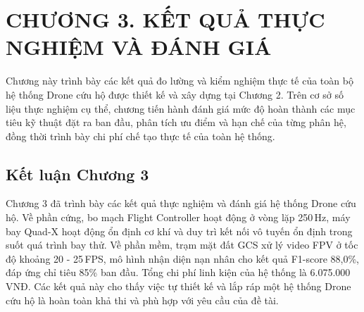 \section*{CHƯƠNG 3. KẾT QUẢ THỰC NGHIỆM VÀ ĐÁNH GIÁ}
\setcounter{section}{3}
\setcounter{subsection}{0}
\setcounter{figure}{0}
\setcounter{table}{0}

Chương này trình bày các kết quả đo lường và kiểm nghiệm thực tế của toàn bộ hệ thống Drone cứu hộ được thiết kế và xây dựng tại Chương 2. Trên cơ sở số liệu thực nghiệm cụ thể, chương tiến hành đánh giá mức độ hoàn thành các mục tiêu kỹ thuật đặt ra ban đầu, phân tích ưu điểm và hạn chế của từng phân hệ, đồng thời trình bày chi phí chế tạo thực tế của toàn hệ thống.



\subsection*{Kết luận Chương 3}

Chương 3 đã trình bày các kết quả thực nghiệm và đánh giá hệ thống Drone cứu hộ. Về phần cứng, bo mạch Flight Controller hoạt động ở vòng lặp 250\,Hz, máy bay Quad-X hoạt động ổn định cơ khí và duy trì kết nối vô tuyến ổn định trong suốt quá trình bay thử. Về phần mềm, trạm mặt đất GCS xử lý video FPV ở tốc độ khoảng 20 - 25\,FPS, mô hình nhận diện nạn nhân cho kết quả F1-score 88,0\%, đáp ứng chỉ tiêu 85\% ban đầu. Tổng chi phí linh kiện của hệ thống là 6.075.000\,VNĐ. Các kết quả này cho thấy việc tự thiết kế và lắp ráp một hệ thống Drone cứu hộ là hoàn toàn khả thi và phù hợp với yêu cầu của đề tài.
